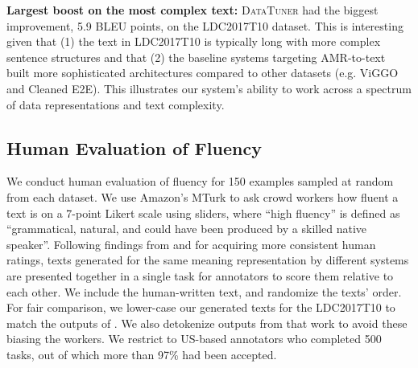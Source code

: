 \documentclass[11pt]{article}
\newcommand{\ldc}{LDC2017T10\xspace}
\newcommand{\viggo}{ViGGO\xspace}
\newcommand{\cleanedee}{Cleaned E2E\xspace}
\newcommand{\system}{\textsc{DataTuner}\xspace}
\theoremstyle{definition}
\theoremstyle{break}
\begin{document}
\textbf{Largest boost on the most complex text:} \system had the biggest improvement, 5.9 BLEU points, on the \ldc dataset.  This is interesting given that (1) the text in \ldc is typically long with more complex sentence structures 
and that (2) the baseline systems targeting AMR-to-text~\cite{zhu-etal-2019-modeling,guo-etal-2019-densely,ribeiro2019enhancing} built more sophisticated architectures compared to other datasets (e.g. \viggo and \cleanedee). 
This illustrates our system's ability to work across a spectrum of data representations and text complexity.

\subsection{Human Evaluation of Fluency}
\label{sec:fluency}


We conduct human evaluation of fluency
for 150 examples sampled at random from each dataset. 
We use Amazon's MTurk to ask crowd workers how fluent a text is on a 7-point Likert scale using sliders, where ``high fluency'' is defined as ``grammatical, natural, and could have been produced by a skilled native speaker''.  Following findings from  and  for acquiring more consistent human ratings, texts generated for the same meaning representation by different systems are presented together in a single task for annotators to score them relative to each other. We include the human-written text, and randomize the texts' order. 
For fair comparison, we lower-case our generated texts for the \ldc to match the outputs of . We also detokenize outputs from that work to avoid these biasing the workers. We restrict to US-based annotators who completed 500 tasks, out of which more than 97\% had been accepted.
\end{document}
